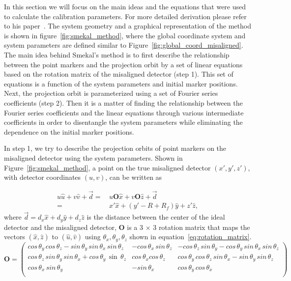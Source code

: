In this section we will focus on the main ideas and the equations that were used to calculate the calibration parameters.  For more detailed derivation please refer to his paper~\cite{Smekal2004}.  The system geometry and a graphical representation of the method is shown in figure~\ref{fig:smekal_method}, where the global coordinate system and system parameters are defined similar to Figure~\ref{fig:global_coord_misaligned}. The main idea behind Smekal's method is to first describe the relationship between the point markers and the projection orbit by a set of linear equations based on the rotation matrix of the misaligned detector (step 1). This set of equations is a function of the system parameters and initial marker positions.  Next, the projection orbit is parameterized using a set of Fourier series coefficients (step 2).  Then it is a matter of finding the relationship between the Fourier series coefficients and the linear equations through various intermediate coefficients in order to disentangle the system parameters while eliminating the dependence on the initial marker positions.

In step 1, we try to describe the projection orbits of point markers on the misaligned detector using the system parameters.  Shown in Figure~\ref{fig:smekal_method}, a point on the true misaligned detector $(x', y', z')$, with detector coordinates $(u, v)$, can be written as

\begin{equation}
\begin{aligned}
u \hat{u} + v \hat{v} + \vec{d} =& \, u \mathrm{\mathbf{O}} \hat{x} + v \mathrm{\mathbf{O}} \hat{z} + \vec{d} \\
								=& \, x' \hat{x} + (y' - R + R_f) \hat{y} + z' \hat{z},
\end{aligned}
\label{eq:projection_orbit}
\end{equation}
where $\vec{d} = d_x \hat{x} + d_y \hat{y} + d_z \hat{z}$ is the distance between the center of the ideal detector and the misaligned detector, $\mathrm{\mathbf{O}}$ is a 3 $\times$ 3 rotation matrix that maps the vectors $(\hat{x}, \hat{z})$ to $(\hat{u}, \hat{v})$ using $\theta_x, \theta_y, \theta_z$ shown in equation~\ref{eq:rotation_matrix}.
\begin{equation}
\mathrm{\mathbf{O}} = 
\begin{pmatrix}
cos\, \theta_y \, cos \,\theta_z - sin \, \theta_y \, sin \, \theta_x \, sin \, \theta_z & -cos \, \theta_x \, sin \, \theta_z & -cos \, \theta_z \, sin \, \theta_y - cos \, \theta_y \, sin \, \theta_x \, sin \, \theta_z \\
cos \, \theta_z \, sin \, \theta_y \, sin \, \theta_x + cos \, \theta_y \, \sin \, \theta_z & cos \, \theta_x cos \, \theta_z & cos \, \theta_y \, cos \, \theta_z \, sin \, \theta_x - sin \, \theta_y \, sin \, \theta_z \\
cos \, \theta_x \, sin \, \theta_y & -sin \, \theta_x & cos \, \theta_y \, cos \, \theta_x \\
\end{pmatrix}
\label{eq:rotation_matrix}
\end{equation}

